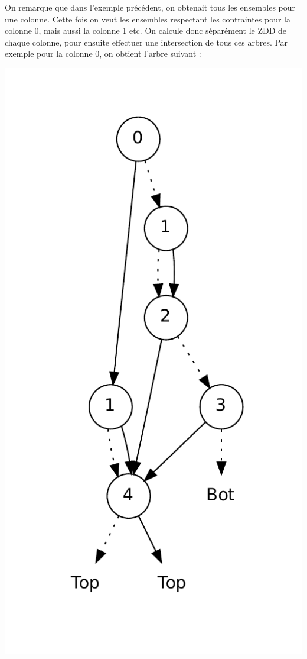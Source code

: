 \documentclass[a4paper]{article}
\begin{document}
On remarque que dans l'exemple précédent, on obtenait tous les ensembles pour
une colonne. Cette fois on veut les ensembles respectant les contraintes pour
la colonne 0, mais aussi la colonne 1 etc. On calcule donc séparément le ZDD
de chaque colonne, 
pour ensuite effectuer une intersection de tous ces arbres.
Par exemple pour la colonne 0, on obtient l'arbre suivant : 

\begin{center}
\includegraphics[scale=0.6]{../imports/column.pdf}
\end{center}
\end{document}
